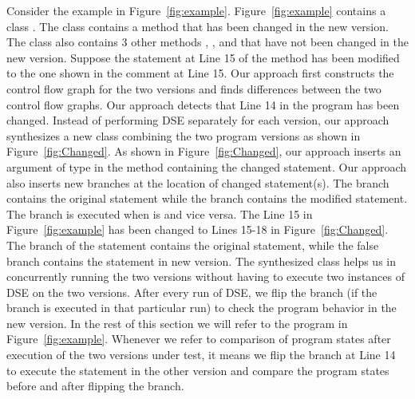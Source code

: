 {Consider the example in Figure~\ref{fig:example}. Figure~\ref{fig:example} contains a class . The class  contains a method  that has been changed in the new version. The class also contains 3 other methods , , and  that have not been changed in the new version. Suppose the statement at Line 15 of the method  has been modified to the one shown in the comment at Line 15. Our approach first constructs the control flow graph for the two versions and finds differences between the two control flow graphs. Our approach detects that Line 14 in the program has been changed. Instead of performing DSE separately for each version, our approach synthesizes a new class combining the two program versions as shown in Figure~\ref{fig:Changed}. As shown in Figure~\ref{fig:Changed}, our approach inserts an argument  of type  in the method containing the changed statement. Our approach also inserts new branches at the location of changed statement(s). The  branch contains the original statement while the  branch contains the modified statement. The  branch is executed when  is  and vice versa. The Line 15 in Figure~\ref{fig:example} has been changed to Lines 15-18 in Figure~\ref{fig:Changed}. The  branch of the  statement contains the original statement, while the false branch contains the statement in new version. The synthesized class  helps us in concurrently running the two versions without having to execute two instances of DSE on the two versions. After every run of DSE, we flip the  branch (if the branch is executed in that particular run) to check the program behavior in the new version. In the rest of this section we will refer to the program in Figure~\ref{fig:example}. Whenever we refer to comparison of program states after execution of the two versions under test, it means we flip the branch at Line 14 to execute the statement in the other version and compare the program states before and after flipping the branch. 

}
